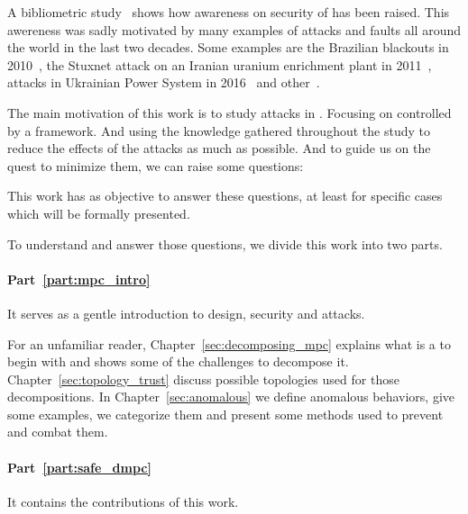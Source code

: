 \documentclass[../main.tex]{subfiles}
\begin{document}
A bibliometric study~\cite{ZacchiaEtAl2019} shows how awareness on security of \cps{} has been raised.
This awereness was sadly motivated by many examples of attacks and faults all around the world in the last two decades.
Some examples are the Brazilian blackouts in 2010~\cite{Conti2010}, the Stuxnet attack on an Iranian uranium enrichment plant in 2011~\cite{Langner2011}, attacks in Ukrainian Power System in 2016~\cite{Bindra2017} and other~\cite{DingEtAl2018,DibajiEtAl2019}.

The main motivation of this work is to study attacks in \cps{}.
Focusing on \cps{} controlled by a \dmpc{} framework.
And using the knowledge gathered throughout the study to reduce the effects of the attacks as much as possible.
And to guide us on the quest to minimize them, we can raise some questions:

This work has as objective to answer these questions, at least for specific cases which will be formally presented.

To understand and answer those questions, we divide this work into two parts.

\paragraph{Part~\ref{part:mpc_intro}} It serves as a gentle introduction to \dmpc{} design, security and attacks.

For an unfamiliar reader, Chapter~\ref{sec:decomposing_mpc} explains what is a \mpc{} to begin with and shows some of the challenges to decompose it.
Chapter~\ref{sec:topology_trust} discuss possible topologies used for those decompositions.
In Chapter~\ref{sec:anomalous} we define anomalous behaviors, give some examples, we categorize them and present some methods used to prevent and combat them.

\paragraph{Part~\ref{part:safe_dmpc}} It contains the contributions of this work.
\end{document}
